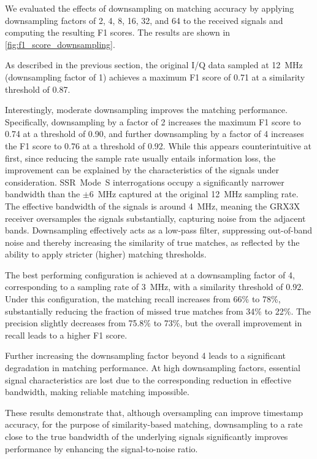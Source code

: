 \documentclass[sigconf, 10pt, nonacm, anonymous]{acmart}  %
\begin{document}
We evaluated the effects of downsampling on matching accuracy by applying downsampling factors of 2, 4, 8, 16, 32, and 64 to the received signals and computing the resulting F1 scores. The results are shown in \autoref{fig:f1_score_downsampling}.

As described in the previous section, the original I/Q data sampled at 12~MHz (downsampling factor of 1) achieves a maximum F1 score of 0.71 at a similarity threshold of 0.87.

Interestingly, moderate downsampling improves the matching performance. Specifically, downsampling by a factor of 2 increases the maximum F1 score to 0.74 at a threshold of 0.90, and further downsampling by a factor of 4 increases the F1 score to 0.76 at a threshold of 0.92. While this appears counterintuitive at first, since reducing the sample rate usually entails information loss, the improvement can be explained by the characteristics of the signals under consideration. SSR~Mode~S interrogations occupy a significantly narrower bandwidth than the $\pm 6$~MHz captured at the original 12~MHz sampling rate. The effective bandwidth of the signals is around 4~MHz, meaning the GRX3X receiver oversamples the signals substantially, capturing noise from the adjacent bands. Downsampling effectively acts as a low-pass filter, suppressing out-of-band noise and thereby increasing the similarity of true matches, as reflected by the ability to apply stricter (higher) matching thresholds.

The best performing configuration is achieved at a downsampling factor of 4, corresponding to a sampling rate of 3~MHz, with a similarity threshold of 0.92. Under this configuration, the matching recall increases from 66\% to 78\%, substantially reducing the fraction of missed true matches from 34\% to 22\%. The precision slightly decreases from 75.8\% to 73\%, but the overall improvement in recall leads to a higher F1 score.

Further increasing the downsampling factor beyond 4 leads to a significant degradation in matching performance. At high downsampling factors, essential signal characteristics are lost due to the corresponding reduction in effective bandwidth, making reliable matching impossible.

These results demonstrate that, although oversampling can improve timestamp accuracy, for the purpose of similarity-based matching, downsampling to a rate close to the true bandwidth of the underlying signals significantly improves performance by enhancing the signal-to-noise ratio.
\end{document}
